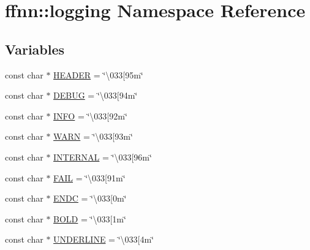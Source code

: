 \hypertarget{namespaceffnn_1_1logging}{\section{ffnn\-:\-:logging Namespace Reference}
\label{namespaceffnn_1_1logging}
}
\subsection*{Variables}
\begin{DoxyCompactItemize}
\item 
const char $\ast$ \hyperlink{group___unicode_color_definitions_ga65590452b7707feb609f43a9ca306d42}{H\-E\-A\-D\-E\-R} = \char`\"{}\textbackslash{}033\mbox{[}95m\char`\"{}
\item 
const char $\ast$ \hyperlink{group___unicode_color_definitions_ga359f39576675d57a59f93e2addae319a}{D\-E\-B\-U\-G} = \char`\"{}\textbackslash{}033\mbox{[}94m\char`\"{}
\item 
const char $\ast$ \hyperlink{group___unicode_color_definitions_gab5d57e4b1db90e208ccad18ce1b0f836}{I\-N\-F\-O} = \char`\"{}\textbackslash{}033\mbox{[}92m\char`\"{}
\item 
const char $\ast$ \hyperlink{group___unicode_color_definitions_gafc935a693ebe97569c82dd2415bb7373}{W\-A\-R\-N} = \char`\"{}\textbackslash{}033\mbox{[}93m\char`\"{}
\item 
const char $\ast$ \hyperlink{group___unicode_color_definitions_ga10413caefeb3f647a80cfdb9d1874276}{I\-N\-T\-E\-R\-N\-A\-L} = \char`\"{}\textbackslash{}033\mbox{[}96m\char`\"{}
\item 
const char $\ast$ \hyperlink{group___unicode_color_definitions_ga2047db0e31e0a45c7c213845567afc06}{F\-A\-I\-L} = \char`\"{}\textbackslash{}033\mbox{[}91m\char`\"{}
\item 
const char $\ast$ \hyperlink{group___unicode_color_definitions_gab21e47dcbc216f8fc7de88bd217f9f0a}{E\-N\-D\-C} = \char`\"{}\textbackslash{}033\mbox{[}0m\char`\"{}
\item 
const char $\ast$ \hyperlink{group___unicode_color_definitions_ga32fca3fc24af93ce9c4ca33b4a6a3dde}{B\-O\-L\-D} = \char`\"{}\textbackslash{}033\mbox{[}1m\char`\"{}
\item 
const char $\ast$ \hyperlink{group___unicode_color_definitions_gab2b4d719c3fe8672abf96e00a37c799c}{U\-N\-D\-E\-R\-L\-I\-N\-E} = \char`\"{}\textbackslash{}033\mbox{[}4m\char`\"{}
\end{DoxyCompactItemize}
